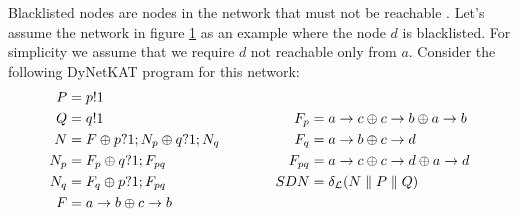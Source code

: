 \begin{example}
    \begin{figure}
        \centering
        \caption{}
        \label{fig:blacklist}
    \end{figure}
    Blacklisted nodes are nodes in the network that must not
    be reachable \cite{network-abstractions}.
    Let's assume the network in figure \ref{fig:blacklist} as
    an example where the node $d$ is blacklisted.
    For simplicity we assume that we require
    $d$ not reachable only from $a$.
    Consider the following DyNetKAT program for this network:
    \begin{equation*}
        \begin{aligned}[c]
            P   & = p!1                             \\
            Q   & = q!1                             \\
            N   & = F \oplus p?1;N_p \oplus q?1;N_q \\
            N_p & = F_p \oplus q?1;F_{pq}           \\
            N_q & = F_q \oplus p?1;F_{pq}           \\
            F   & = a\ra b \oplus c\ra b            \\
        \end{aligned}
        \qquad\qquad
        \begin{aligned}[c]
            F_p         & = a\ra c \oplus c\ra b \oplus a\ra b \\
            F_q         & = a\ra b \oplus c\ra d               \\
            F_{pq}      & = a\ra c \oplus c\ra d \oplus a\ra d \\
            SDN         & = \delta_{\mathcal{L}} (N
            \parallel P \parallel Q)                           \\

\end{aligned}
\end{equation*}
\end{example}
